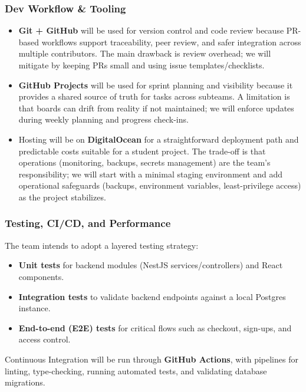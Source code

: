 \documentclass{article}
\begin{document}
\subsubsection*{Dev Workflow \& Tooling}
\begin{itemize}
  \item \textbf{Git + GitHub} will be used for version control and code review because PR-based workflows support traceability, peer review, and safer integration across multiple contributors. The main drawback is review overhead; we will mitigate by keeping PRs small and using issue templates/checklists.
  \item \textbf{GitHub Projects} will be used for sprint planning and visibility because it provides a shared source of truth for tasks across subteams. A limitation is that boards can drift from reality if not maintained; we will enforce updates during weekly planning and progress check-ins.
  \item Hosting will be on \textbf{DigitalOcean} for a straightforward deployment path and predictable costs suitable for a student project. The trade-off is that operations (monitoring, backups, secrets management) are the team’s responsibility; we will start with a minimal staging environment and add operational safeguards (backups, environment variables, least-privilege access) as the project stabilizes.
\end{itemize}

\subsubsection*{Testing, CI/CD, and Performance} 
The team intends to adopt a layered testing strategy:
\begin{itemize}
  \item \textbf{Unit tests} for backend modules (NestJS services/controllers) and React components.
  \item \textbf{Integration tests} to validate backend endpoints against a local Postgres instance.
  \item \textbf{End-to-end (E2E) tests} for critical flows such as checkout, sign-ups, and access control.
\end{itemize}
Continuous Integration will be run through \textbf{GitHub Actions}, with pipelines for linting, type-checking, running automated tests, and validating database migrations.
\end{document}
